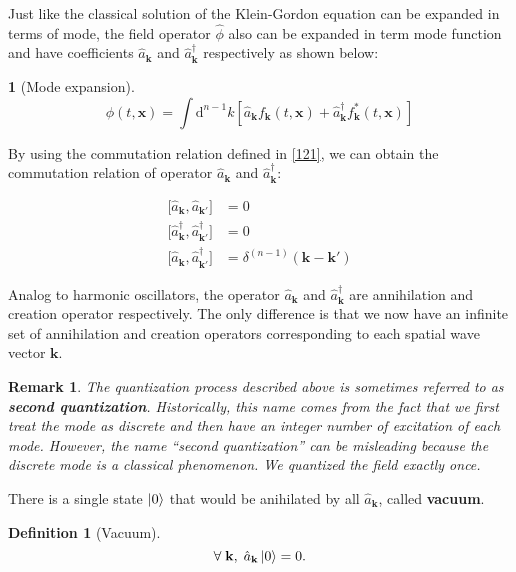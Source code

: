 \documentclass[12pt]{article}
\numberwithin{equation}{section}
\theoremstyle{1style}
\newtheorem{definition}[equation]{Definition}
\newtheorem{cthm}[equation]{}
\newtheorem*{remark}{Remark}
\newcommand{\tbf}[1]{\textbf{#1}}
\newcommand{\id}{\mathrm{d}}
\begin{document}
Just like the classical solution of the Klein-Gordon equation can be expanded in terms of mode,
the field operator \(\hat{\phi}\) also can be expanded in term mode function and have coefficients \(\hat{a}_{\mathbf{k}}\) and
\(\hat{a}^{\dagger}_{\mathbf{k}}\) respectively as shown below:
\begin{cthm}[Mode expansion]
  \[\phi(t,\mathbf{x})=\int\id^{n-1}k\left[\hat{a}_{\mathbf{k}}f_{\mathbf{k}}(t,\mathbf{x})+
    \hat{a}^{\dagger}_{\mathbf{k}}f^*_{\mathbf{k}}(t,\mathbf{x})\right]\]
\end{cthm}
By using the commutation relation defined in \ref{121}, we can obtain the commutation relation of operator \(\hat{a}_{\mathbf{k}}\) and
\(\hat{a}^{\dagger}_{\mathbf{k}}\):


\begin{align}
  \bigl[\hat{a}_{\mathbf{k}},\hat{a}_{\mathbf{k'}}\bigr]                     & =0                                      \\
  \bigl[\hat{a}^{\dagger}_{\mathbf{k}},\hat{a}^{\dagger}_{\mathbf{k'}}\bigr] & =0                                      \\
  \bigl[\hat{a}_{\mathbf{k}},\hat{a}^{\dagger}_{\mathbf{k'}}\bigr]           & =\delta^{(n-1)}(\mathbf{k}-\mathbf{k'})
\end{align}


Analog to harmonic oscillators, the operator \(\hat{a}_{\mathbf{k}}\) and
\(\hat{a}^{\dagger}_{\mathbf{k}}\) are annihilation and creation operator respectively.
The only difference is that we now have an infinite set of annihilation and creation operators corresponding to each spatial wave vector \(\mathbf{k}\).

\begin{remark}
  The quantization process described above is sometimes referred to as \tbf{second quantization}. Historically, this name
  comes from the fact that we first treat the mode as discrete and then have an integer number of excitation of each mode.
  However, the name ``second quantization'' can be misleading because the discrete mode is a classical phenomenon.
  We quantized the field exactly once.
\end{remark}


There is a single state \(\ket{0}\) that would be anihilated by all \(\hat{a}_{\mathbf{k}}\), called \tbf{vacuum}.
\begin{definition}[Vacuum]
  \[\forall\; \mathbf{k},\; \hat{a}_{\mathbf{k}}\ket{0}=0.\]
\end{definition}
\end{document}
